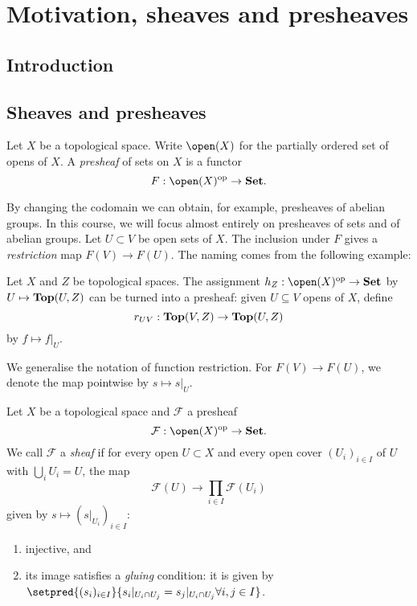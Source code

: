 \chapter{Motivation, sheaves and presheaves}

\section{Introduction}


\section{Sheaves and presheaves}

\begin{defn}
    Let $X$ be a topological space. Write $\open(X)$ for the partially ordered set of opens of $X$.  A \emph{presheaf} of sets on $X$ is a functor
    \[
        F: \open(X)\opp \to \catSet. 
    \]  
\end{defn}
By changing the codomain we can obtain, for example, presheaves of abelian groups. In this course, we will focus almost entirely on presheaves of sets and of abelian groups.
Let $U \subset V $ be open sets of $X$. The inclusion under $F$ gives a \emph{restriction} map $F(V) \to F(U)$. The naming comes from the following example: 

\begin{exmp}\label{exmp:ct-maps-presheaf}
    Let $X$ and $Z$ be topological spaces. The assignment $h_Z: \open(X)\opp \to \catSet$ by $U \mapsto \cont(U,Z)$ can be turned into a presheaf: given $U \subseteq V$ opens of $X$, define $$r_{UV}: \cont(V,Z) \to \cont(U,Z)$$ by $f \mapsto f|_U$.
\end{exmp}
We generalise the notation of function restriction. For $F(V) \to F(U)$, we denote the map pointwise by $s \mapsto s|_U$.

\begin{defn}\label{defn:sheaf}
    Let $X$ be a topological space and $\mathcal{F}$ a presheaf \[\mathcal{F}: \open(X)\opp \to \catSet. \] We call $\mathcal{F}$ a \emph{sheaf} if
    for every open $U \subset X$ and every open cover $(U_i)_{i \in I}$ of $U$ with $\bigcup_i U_i = U$, the map 
        \[
            \mathcal{F}(U) \to \prod_{i\in I}\mathcal{F}(U_i)
        \] given by $s \mapsto (s|_{U_i})_{i \in I}$:
    \begin{enumerate}
        \item injective, and
        \item its image satisfies a \emph{gluing} condition: it is given by $\setpred{(s_i)_{i\in I}}{s_i |_{U_i \cap U_j} = s_j | _ {U_i \cap U_j} \forall i,j \in I}$.
    \end{enumerate}
\end{defn}

